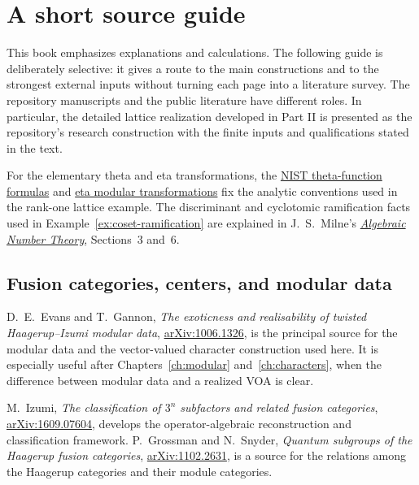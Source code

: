 \chapter{A short source guide}
\label{ch:sources}

This book emphasizes explanations and calculations. The following
guide is deliberately selective: it gives a route to the main
constructions and to the strongest external inputs without turning
each page into a literature survey. The repository manuscripts
and the public literature have different roles. In particular,
the detailed lattice realization developed in Part II is presented
as the repository's research construction with the finite inputs
and qualifications stated in the text.

\raggedright

For the elementary theta and eta transformations, the
\href{https://dlmf.nist.gov/20.7#viii}{NIST theta-function formulas}
and \href{https://dlmf.nist.gov/23.18}{eta modular transformations}
fix the analytic conventions used in the rank-one lattice example.
The discriminant and cyclotomic ramification facts used in
Example~\ref{ex:coset-ramification} are explained in
J.~S.~Milne's \href{https://www.jmilne.org/math/CourseNotes/ANT.pdf}
{\emph{Algebraic Number Theory}}, Sections~3 and~6.

\section*{Fusion categories, centers, and modular data}

D.~E.~Evans and T.~Gannon,
\emph{The exoticness and realisability of twisted Haagerup--Izumi
modular data},
\href{https://arxiv.org/abs/1006.1326}{arXiv:1006.1326},
is the principal source for the modular data and the
vector-valued character construction used here.
It is especially useful after Chapters~\ref{ch:modular}
and~\ref{ch:characters}, when the difference between modular
data and a realized VOA is clear.

M.~Izumi,
\emph{The classification of $3^n$ subfactors and related fusion
categories},
\href{https://arxiv.org/abs/1609.07604}{arXiv:1609.07604},
develops the operator-algebraic reconstruction and classification
framework. P.~Grossman and N.~Snyder,
\emph{Quantum subgroups of the Haagerup fusion categories},
\href{https://arxiv.org/abs/1102.2631}{arXiv:1102.2631},
is a source for the relations among the Haagerup categories and
their module categories.


